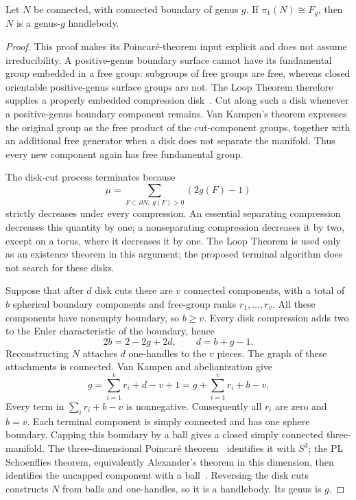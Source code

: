 \begin{lemma}
\label{lem:free-boundary-rank}
Let $N$ be connected, with connected boundary of genus $g$.  If
$\pi_1(N)\cong F_g$, then $N$ is a genus-$g$ handlebody.
\end{lemma}
\begin{proof}
This proof makes its Poincar\'e-theorem input explicit and does not assume
irreducibility.  A positive-genus boundary surface cannot have its
fundamental group embedded in a free group: subgroups of free groups are
free, whereas closed orientable positive-genus surface groups are not.
The Loop Theorem therefore supplies a properly embedded compression
disk~\cite[Theorem 3.1]{HatcherNotes}.
Cut along such a disk whenever a positive-genus boundary component
remains.  Van Kampen's theorem expresses the original group as the free
product of the cut-component groups, together with an additional free
generator when a disk does not separate the manifold.  Thus every new
component again has free fundamental group.

The disk-cut process terminates because
\[
 \mu=\sum_{F\subset\partial N,\ g(F)>0}(2g(F)-1)
\]
strictly decreases under every compression.  An essential separating
compression decreases this quantity by one; a nonseparating compression
decreases it by two, except on a torus, where it decreases it by one.
The Loop Theorem is used only as an existence theorem in this argument;
the proposed terminal algorithm does not search for these disks.

Suppose that after $d$ disk cuts there are $v$ connected components,
with a total of $b$ spherical boundary components and free-group ranks
$r_1,\ldots,r_v$.  All these components have nonempty boundary, so
$b\geq v$.  Every disk compression adds two to the Euler characteristic
of the boundary, hence
\[
 2b=2-2g+2d,\qquad d=b+g-1.
\]
Reconstructing $N$ attaches $d$ one-handles to the $v$ pieces.  The graph
of these attachments is connected.  Van Kampen and abelianization give
\[
 g=\sum_{i=1}^v r_i+d-v+1
  =g+\sum_{i=1}^v r_i+b-v.
\]
Every term in $\sum_i r_i+b-v$ is nonnegative.  Consequently all $r_i$
are zero and $b=v$.  Each terminal component is simply connected and has
one sphere boundary.  Capping this boundary by a ball gives a closed
simply connected three-manifold.  The three-dimensional Poincar\'e
theorem~\cite{PerelmanExtinction} identifies it with $S^3$; the PL Schoenflies theorem, equivalently
Alexander's theorem in this dimension, then identifies the uncapped
component with a ball~\cite[Theorem 1.1]{HatcherNotes}.  Reversing the disk cuts constructs $N$ from balls
and one-handles, so it is a handlebody.  Its genus is $g$.
\end{proof}

